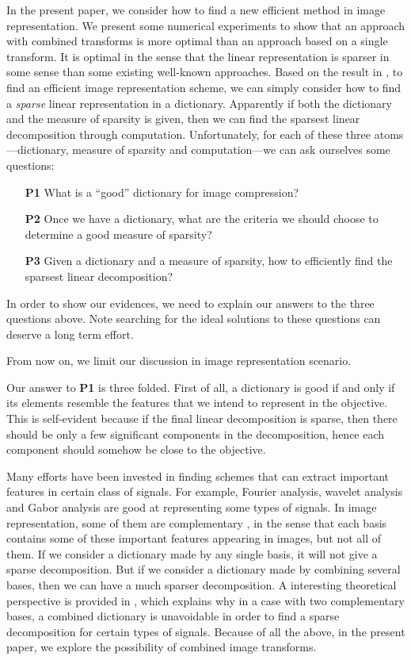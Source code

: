 \documentclass[11pt,draft]{IEEEtran} %
\begin{document}
In the present paper, we consider how to find a new efficient method
in image representation. We present some numerical experiments to show that an 
approach with combined transforms is more optimal than an approach
based on a single transform. It is optimal in the
sense that the linear representation is sparser in some sense than some 
existing well-known approaches.
Based on the result in
\cite{MallatFalzon,DonohoIT50}, to find an efficient image
representation scheme, we can simply consider how to find a
{\it sparse} linear representation in a dictionary. 
Apparently if both the dictionary
and the measure of sparsity is given, then we can find the sparsest
linear decomposition through computation. Unfortunately, for each of
these three atoms---dictionary, measure of sparsity and computation---we
can ask ourselves some questions: 
\begin{itemize}
\item[{\bf P1}] What is a ``good'' dictionary for image compression?
\item[{\bf P2}] Once we have a dictionary, what are the criteria we
  should choose to determine a good measure of sparsity? 
\item[{\bf P3}] Given a dictionary and a measure of sparsity, how to
  efficiently find the sparsest linear decomposition? 
\end{itemize}

In order to show our evidences, we
need to explain our answers to the three questions above. Note
searching for the ideal solutions to these questions can deserve a long 
term effort. 

From now on, we limit our discussion in image representation scenario.

Our answer to {\bf P1} is three folded. First of all, a dictionary is
good if and only if its elements resemble the features that we intend
to represent in the objective. This is self-evident because if the
final linear decomposition is sparse, then there should be only
a few significant components in the decomposition, hence each
component should somehow be close to the objective. 

Many efforts have been invested in finding schemes that can
extract important features in certain class of signals. For example,
Fourier analysis, wavelet analysis and Gabor analysis are good at
representing some types of signals. In image representation, some of
them are complementary \cite{HuoThesis}, in the sense that each basis
contains some of these important features appearing in images, but not 
all of them. If we consider a dictionary made by any single basis, it
will not give a sparse decomposition. But if we consider a dictionary
made by combining several bases, then we can have a much sparser
decomposition. A interesting theoretical perspective is provided in
\cite{DonohoHuoUP}, which explains why in a case with two
complementary bases, a combined dictionary is unavoidable in order to
find a sparse decomposition for certain types of signals. Because of
all the above, in the present paper, we explore the possibility of
combined image transforms. 
\end{document}

